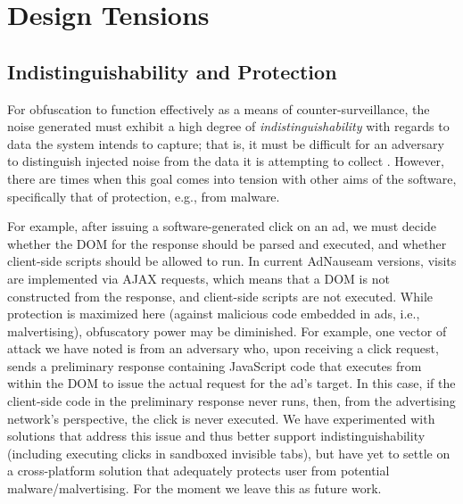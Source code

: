 \documentclass[conference]{IEEEtran}
\begin{document}
\section{Design Tensions}

\subsection{Indistinguishability and Protection}

For obfuscation to function effectively as a means of counter-surveillance, the noise generated must exhibit a high degree of \emph{indistinguishability} with regards to data the system intends to capture; that is, it must be difficult for an adversary to distinguish injected noise from the data it is attempting to collect \cite{Gervais}. However, there are times when this goal comes into tension with other aims of the software, specifically that of protection, e.g., from malware.

For example, after issuing a software-generated click on an ad, we must decide whether the DOM for the response should be parsed and executed, and whether client-side scripts should be allowed to run. In current AdNauseam versions, visits are implemented via AJAX requests, which means that a DOM is not constructed from the response, and client-side scripts are not executed. While protection is maximized here (against malicious code embedded in ads, i.e., malvertising), obfuscatory power may be diminished. For example, one vector of attack we have noted is from an adversary who, upon receiving a click request, sends a preliminary response containing JavaScript code that executes from within the DOM to issue the actual request for the ad's target. In this case, if the client-side code in the preliminary response never runs, then, from the advertising network's perspective, the click is never executed. We have experimented with solutions that address this issue and thus better support indistinguishability (including executing clicks in sandboxed invisible tabs), but have yet to settle on a cross-platform solution that adequately protects user from potential malware/malvertising. For the moment we leave this as future work.
\end{document}
